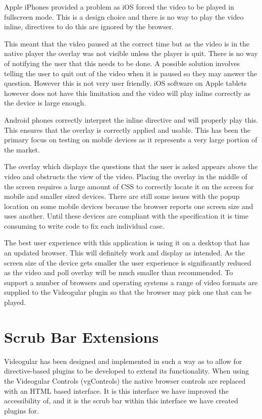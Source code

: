 Apple iPhones provided a problem as iOS forced the video to be played in fullscreen mode. This is a design choice and there is no way to play the video inline, directives to do this are ignored by the browser.

This meant that the video paused at the correct time but as the video is in the native player the overlay was not visible unless the player is quit. There is no way of notifying the user that this needs to be done. A possible solution involves telling the user to quit out of the video when it is paused so they may answer the question. However this is not very user friendly. iOS software on Apple tablets however does not have this limitation and the video will play inline correctly as the device is large enough.

Android phones correctly interpret the inline directive and will properly play this. This ensures that the overlay is correctly applied and usable. This has been the primary focus on testing on mobile devices as it represents a very large portion of the market.

The overlay which displays the questions that the user is asked appears above the video and obstructs the view of the video. Placing the overlay in the middle of the screen requires a large amount of \gls{CSS} to correctly locate it on the screen for mobile and smaller sized devices. There are still some issues with the popup location on some mobile devices because the browser reports one screen size and uses another. Until these devices are compliant with the specification it is time consuming to write code to fix each individual case.

The best user experience with this application is using it on a desktop that has an updated browser. This will definitely work and display as intended. As the screen size of the device gets smaller the user experience is significantly reduced as the video and poll overlay will be much smaller than recommended. To support a number of browsers and operating systems a range of video formats are supplied to the \gls{Videogular} plugin so that the browser may pick one that can be played.

\section{Scrub Bar Extensions} 
\label{Section:Scrub Bar Extensions}

\gls{Videogular} has been designed and implemented in such a way as to allow for directive-based plugins to be developed to extend its functionality. When using the \gls{Videogular} Controls (vgControls) the native browser controls are replaced with an HTML based interface. It is this interface we have improved the accessibility of, and it is the scrub bar within this interface we have created plugins for.

